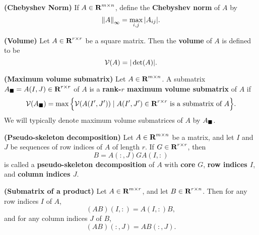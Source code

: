 \documentclass{article}
\begin{document}
	\begin{dfn} \textnormal{\bf(Chebyshev Norm)}
		\label{def:chebyshev_norm}
		If $A \in \textnormal{\bf R}^{m\times n}$, define the \textbf{Chebyshev norm} of $A$ by
		\begin{equation}
			\label{eq:chebyshev_norm}
			\left\lVert A \right\rVert_\infty = \max_{i,j} |A_{ij}|.
		\end{equation}
	\end{dfn}
	
	\begin{dfn} \textnormal{\bf(Volume)}
		\label{def:volume}
		Let $A \in \textnormal{\bf R}^{r\times r}$ be a square matrix. Then the \textbf{volume} of $A$ is defined to be
		\begin{equation}
			\mathcal{V}(A) = |\det(A)|.
		\end{equation}
	\end{dfn}
	
	\begin{dfn} \textnormal{\bf(Maximum volume submatrix)}
		\label{def:max_volume_submatrix}
		Let $A \in \textnormal{\bf R}^{m\times n}$. A submatrix $A_\blacksquare = A(I,J) \in \textnormal{\bf R}^{r\times r}$ of $A$ is a \textbf{rank-$r$ maximum volume submatrix} of $A$ if
		\begin{equation}
			\mathcal{V}(A_\blacksquare) = \max\Big\{\mathcal{V}(A(I', J')) \mid A(I',J') \in \textnormal{\bf R}^{r\times r} \textnormal{ is a submatrix of } A\Big\}.
		\end{equation}
		We will typically denote maximum volume submatrices of $A$ by $A_\blacksquare$.
	\end{dfn}
	
	\begin{dfn} \textnormal{\bf(Pseudo-skeleton decomposition)}
		Let $A \in \textnormal{\bf R}^{m\times n}$ be a matrix, and let $I$ and $J$ be sequences of row indices of $A$ of length $r$. If $G \in \textnormal{\bf R}^{r\times r}$, then
		\begin{equation}
			B = A(:, J) G A(I,:)
		\end{equation}
		is called a \textbf{pseudo-skeleton decomposition} of $A$ with \textbf{core} $G$, \textbf{row indices $I$}, and \textbf{column indices $J$}.
	\end{dfn}
	
	\begin{lem} \textnormal{\bf(Submatrix of a product)}
	\label{lem:submatrix_prod}
	Let $A\in \textnormal{\bf R}^{m\times r}$, and let $B\in \textnormal{\bf R}^{r\times n}$. Then for any row indices $I$ of $A$,
	\begin{equation}
		(AB)(I,:) = A(I,:)B,
	\end{equation}
	and for any column indices $J$ of $B$,
	\begin{equation}
		(AB)(:,J) = AB(:,J).
	\end{equation}
	\end{lem}
	
\end{document}
